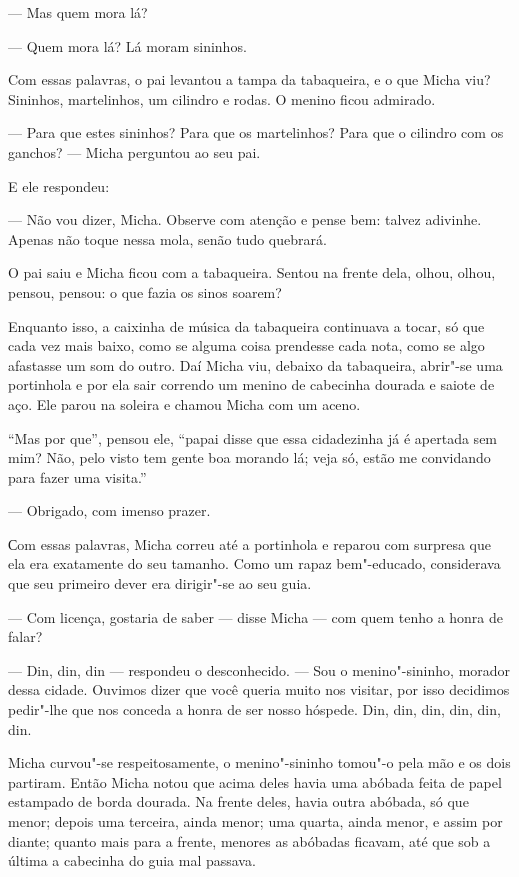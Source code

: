 --- Mas quem mora lá?

--- Quem mora lá? Lá moram sininhos.

Com essas palavras, o pai levantou a tampa da tabaqueira, e o que Micha
viu? Sininhos, martelinhos, um cilindro e rodas. O menino ficou admirado.

--- Para que estes sininhos? Para que os martelinhos? Para que o
cilindro com os ganchos? --- Micha perguntou ao seu pai.

E ele respondeu:

--- Não vou dizer, Micha. Observe com atenção e pense bem: talvez
adivinhe. Apenas não toque nessa mola, senão tudo quebrará.

O pai saiu e Micha ficou com a tabaqueira. Sentou na frente dela, olhou,
olhou, pensou, pensou: o que fazia os sinos soarem?

Enquanto isso, a caixinha de música da tabaqueira continuava a tocar, só
que cada vez mais baixo, como se alguma coisa prendesse cada nota, como
se algo afastasse um som do outro. Daí Micha viu, debaixo da tabaqueira,
abrir"-se uma portinhola e por ela sair correndo um menino de cabecinha
dourada e saiote de aço. Ele parou na soleira e chamou Micha com um
aceno.

``Mas por que'', pensou ele, ``papai disse que essa cidadezinha já é
apertada sem mim? Não, pelo visto tem gente boa morando lá; veja só,
estão me convidando para fazer uma visita.''

--- Obrigado, com imenso prazer.

Сom essas palavras, Micha correu até a portinhola e reparou com surpresa
que ela era exatamente do seu tamanho. Como um rapaz bem"-educado,
considerava que seu primeiro dever era dirigir"-se ao seu guia.

--- Com licença, gostaria de saber --- disse Micha --- com quem tenho a
honra de falar?

--- Din, din, din --- respondeu o desconhecido. --- Sou o
menino"-sininho, morador dessa cidade. Ouvimos dizer que você queria
muito nos visitar, por isso decidimos pedir"-lhe que nos conceda a honra
de ser nosso hóspede. Din, din, din, din, din, din.

Micha curvou"-se respeitosamente, o menino"-sininho tomou"-o pela mão e os
dois partiram. Então Micha notou que acima deles havia uma abóbada feita
de papel estampado de borda dourada. Na frente deles, havia outra
abóbada, só que menor; depois uma terceira, ainda menor; uma quarta,
ainda menor, e assim por diante; quanto mais para a frente, menores as
abóbadas ficavam, até que sob a última a cabecinha do guia mal passava.


